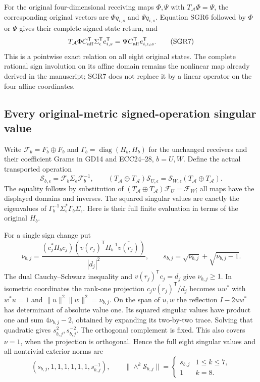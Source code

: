 For the original four-dimensional receiving maps $\Phi,\Psi$ with
$T_{\mathcal A}\Phi=\Psi$, the corresponding original vectors are
$\Phi q_{i,s}$ and $\Psi q_{i,s}$. Equation SGR6 followed by
$\Phi$ or $\Psi$ gives their complete signed-state return, and
\[
 T_{\mathcal A}\Phi C_{\rm aff}^{\mathsf T}
       \Sigma_\epsilon^{\mathsf T}e_{i,s}^{\mathsf T}
 =\Psi C_{\rm aff}^{\mathsf T}e_{i,\epsilon_i s}^{\mathsf T}.
 \tag{SGR7}
\]
This is a pointwise exact relation on all eight original states.
The complete rational sign involution on its affine domain remains
the nonlinear map already derived in the manuscript; SGR7 does not
replace it by a linear operator on the four affine coordinates.

\subsection{Every original-metric signed-operation singular value}
Write $\mathcal F_b=F_b\oplus F_b$ and
$\Gamma_b=\operatorname{diag}(H_b,H_b)$ for the unchanged receivers
and their coefficient Grams in GD14 and ECC24--28, $b=U,W$.
Define the actual transported operation
\[
 \mathscr S_{b,\epsilon}=\mathcal F_b\Sigma_\epsilon\mathcal F_b^{-1},
 \qquad
 (T_{\mathcal A}\oplus T_{\mathcal A})\mathscr S_{U,\epsilon}
   =\mathscr S_{W,\epsilon}(T_{\mathcal A}\oplus T_{\mathcal A}).
 \tag{SGR8}
\]
The equality follows by substitution of
$(T_{\mathcal A}\oplus T_{\mathcal A})\mathcal F_U=\mathcal F_W$;
all maps have the displayed domains and inverses. The squared
singular values are exactly the eigenvalues of
$\Gamma_b^{-1}\Sigma_\epsilon^*\Gamma_b\Sigma_\epsilon$.
Here is their full finite evaluation in terms of the original $H_b$.

For a single sign change put
\[
 \nu_{b,j}=
 \frac{(c_j^*H_bc_j)
        (v(r_j)^{\mathsf T}H_b^{-1}\overline{v(r_j)})}{|d_j|^2},
 \qquad s_{b,j}=\sqrt{\nu_{b,j}}+\sqrt{\nu_{b,j}-1}.
 \tag{SGR9}
\]
The dual Cauchy--Schwarz inequality and $v(r_j)^{\mathsf T}c_j=d_j$
give $\nu_{b,j}\ge1$. In isometric coordinates the rank-one
projection $c_jv(r_j)^{\mathsf T}/d_j$ becomes $uw^*$ with
$w^*u=1$ and $\|u\|^2\|w\|^2=\nu_{b,j}$. On the span of $u,w$
the reflection $I-2uw^*$ has determinant of absolute value one.
Its squared singular values have product one and sum
$4\nu_{b,j}-2$, obtained by expanding its two-by-two trace.
Solving that quadratic gives $s_{b,j}^2,s_{b,j}^{-2}$.
The orthogonal complement is fixed. This also covers $\nu=1$,
when the projection is orthogonal. Hence the full eight singular
values and all nontrivial exterior norms are
\[
 (s_{b,j},1,1,1,1,1,1,s_{b,j}^{-1}),\qquad
 \|\wedge^k\mathscr S_{b,j}\|=
 \begin{cases}s_{b,j}&1\le k\le7,\\1&k=8.\end{cases}
 \tag{SGR10}
\]


